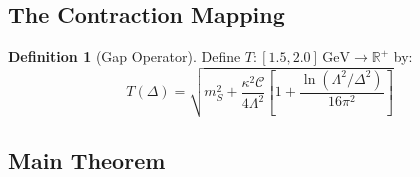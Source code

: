 \documentclass[11pt,a4paper]{article}
\providecommand{\R}{\mathbb{R}}
\theoremstyle{plain}
\theoremstyle{definition}
\newtheorem{definition}[theorem]{Definition}
\begin{document}
\subsection{The Contraction Mapping}

\begin{definition}[Gap Operator]
Define $T: [1.5, 2.0]\,\mathrm{GeV} \to \R^+$ by:
\begin{equation}
T(\Delta) = \sqrt{m_S^2 + \frac{\kappa^2\mathcal{C}}{4\Lambda^2}\left[1 + \frac{\ln(\Lambda^2/\Delta^2)}{16\pi^2}\right]}
\label{eq:gap_operator}
\end{equation}
\end{definition}

\subsection{Main Theorem}
\end{document}
